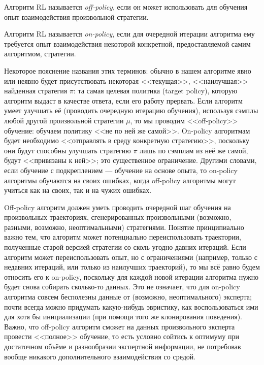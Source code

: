 \begin{definition}
Алгоритм RL называется \emph{off-policy}, если он может использовать для обучения опыт взаимодействия произвольной стратегии.
\end{definition}

\begin{definition}
Алгоритм RL называется \emph{on-policy}, если для очередной итерации алгоритма ему требуется опыт взаимодействия некоторой конкретной, предоставляемой самим алгоритмом, стратегии.
\end{definition}

Некоторое пояснение названия этих терминов: обычно в нашем алгоритме явно или неявно будет присутствовать некоторая <<текущая>>, <<наилучшая>> найденная стратегия $\pi$: та самая целевая политика (target policy), которую алгоритм выдаст в качестве ответа, если его работу прервать. Если алгоритм умеет улучшать её (проводить очередную итерацию обучения), используя сэмплы любой другой произвольной стратегии $\mu$, то мы проводим <<off-policy>> обучение: обучаем политику <<не по ней же самой>>. On-policy алгоритмам будет необходимо <<отправлять в среду конкретную стратегию>>, поскольку они будут способны улучшать стратегию $\pi$ лишь по сэмплам из неё же самой, будут <<привязаны к ней>>; это существенное ограничение. Другими словами, если обучение с подкреплением --- обучение на основе опыта, то on-policy алгоритмы обучаются на своих ошибках, когда off-policy алгоритмы могут учиться как на своих, так и на чужих ошибках.

Off-policy алгоритм должен уметь проводить очередной шаг обучения на произвольных траекториях, сгенерированных произвольными (возможно, разными, возможно, неоптимальными) стратегиями. Понятие принципиально важно тем, что алгоритм может потенциально переиспользовать траектории, полученные старой версией стратегии со сколь угодно давних итераций. Если алгоритм может переиспользовать опыт, но с ограничениями (например, только с недавних итераций, или только из наилучших траекторий), то мы всё равно будем относить его к on-policy, поскольку для каждой новой итерации алгоритма нужно будет снова собирать сколько-то данных. Это не означает, что для on-policy алгоритма совсем бесполезны данные от (возможно, неоптимального) эксперта; почти всегда можно придумать какую-нибудь эвристику, как воспользоваться ими для хотя бы инициализации (при помощи того же клонирования поведения). Важно, что off-policy алгоритм сможет на данных произвольного эксперта провести <<полное>> обучение, то есть условно сойтись к оптимуму при достаточном объёме и разнообразии экспертной информации, не потребовав вообще никакого дополнительного взаимодействия со средой.

